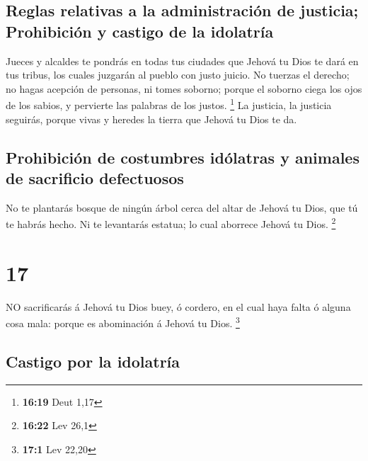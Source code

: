 \hypertarget{reglas-relativas-a-la-administraciuxf3n-de-justicia-prohibiciuxf3n-y-castigo-de-la-idolatruxeda}{%
\subsection{Reglas relativas a la administración de justicia;
Prohibición y castigo de la
idolatría}\label{reglas-relativas-a-la-administraciuxf3n-de-justicia-prohibiciuxf3n-y-castigo-de-la-idolatruxeda}}

 Jueces y alcaldes te pondrás en todas tus ciudades que
Jehová tu Dios te dará en tus tribus, los cuales juzgarán al pueblo con
justo juicio.  No tuerzas el derecho; no hagas acepción de
personas, ni tomes soborno; porque el soborno ciega los ojos de los
sabios, y pervierte las palabras de los justos. \footnote{\textbf{16:19}
  Deut 1,17}  La justicia, la justicia seguirás, porque
vivas y heredes la tierra que Jehová tu Dios te da.

\hypertarget{prohibiciuxf3n-de-costumbres-iduxf3latras-y-animales-de-sacrificio-defectuosos}{%
\subsection{Prohibición de costumbres idólatras y animales de sacrificio
defectuosos}\label{prohibiciuxf3n-de-costumbres-iduxf3latras-y-animales-de-sacrificio-defectuosos}}

 No te plantarás bosque de ningún árbol cerca del altar de
Jehová tu Dios, que tú te habrás hecho.  Ni te levantarás
estatua; lo cual aborrece Jehová tu Dios. \footnote{\textbf{16:22} Lev
  26,1}

\hypertarget{section-16}{%
\section{17}\label{section-16}}

 NO sacrificarás á Jehová tu Dios buey, ó cordero, en el
cual haya falta ó alguna cosa mala: porque es abominación á Jehová tu
Dios. \footnote{\textbf{17:1} Lev 22,20}

\hypertarget{castigo-por-la-idolatruxeda}{%
\subsection{Castigo por la
idolatría}\label{castigo-por-la-idolatruxeda}}

